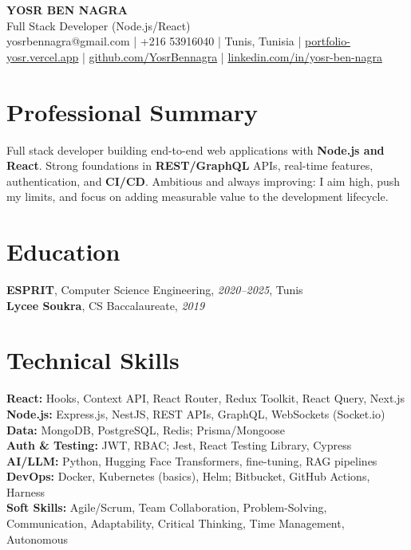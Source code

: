\documentclass[10pt,a4paper]{article}
\begin{document}
\begin{center}
  {\Large\bfseries YOSR BEN NAGRA}\\[2pt]
  {\small Full Stack Developer (Node.js/React)}\\[3pt]
  {\footnotesize yosrbennagra@gmail.com \;|\; +216 53916040 \;|\; Tunis, Tunisia \;|\; \href{https://portfolio-yosr.vercel.app/en}{portfolio-yosr.vercel.app} \;|\; \href{https://github.com/YosrBennagra}{github.com/YosrBennagra} \;|\; \href{https://www.linkedin.com/in/yosr-ben-nagra/}{linkedin.com/in/yosr-ben-nagra}}
\end{center}

\section*{Professional Summary}
{\small
Full stack developer building end-to-end web applications with \textbf{Node.js and React}. Strong foundations in \textbf{REST/GraphQL} APIs, real-time features, authentication, and \textbf{CI/CD}. Ambitious and always improving: I aim high, push my limits, and focus on adding measurable value to the development lifecycle.
}

\vspace{4pt}

\section*{Education}
{\small
\textbf{ESPRIT}, Computer Science Engineering, \textit{2020--2025}, Tunis\\[1pt]
\textbf{Lycee Soukra}, CS Baccalaureate, \textit{2019}
}

\vspace{4pt}

\section*{Technical Skills}
{\small
\textbf{React:} Hooks, Context API, React Router, Redux Toolkit, React Query, Next.js\\[2pt]
\textbf{Node.js:} Express.js, NestJS, REST APIs, GraphQL, WebSockets (Socket.io)\\[2pt]
\textbf{Data:} MongoDB, PostgreSQL, Redis; Prisma/Mongoose\\[2pt]
\textbf{Auth \& Testing:} JWT, RBAC; Jest, React Testing Library, Cypress\\[2pt]
\textbf{AI/LLM:} Python, Hugging Face Transformers, fine-tuning, RAG pipelines\\[2pt]
\textbf{DevOps:} Docker, Kubernetes (basics), Helm; Bitbucket, GitHub Actions, Harness\\[2pt]
\textbf{Soft Skills:} Agile/Scrum, Team Collaboration, Problem-Solving, Communication, Adaptability, Critical Thinking, Time Management, Autonomous
}
\end{document}
